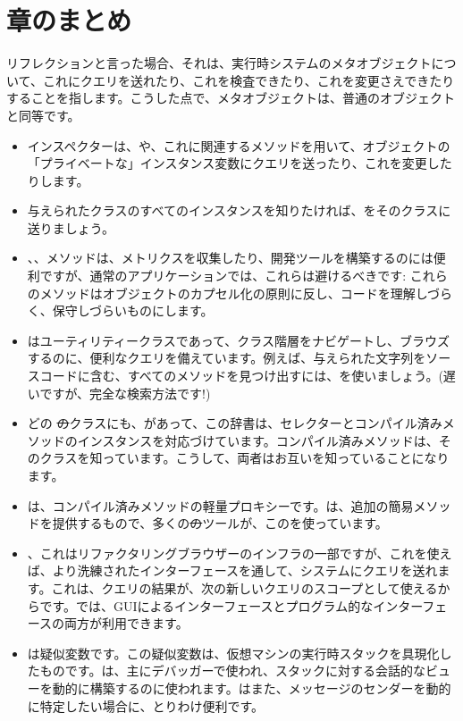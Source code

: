 \documentclass[a4paper,10pt,twoside]{book}
\begin{document}
\section{章のまとめ}

リフレクションと言った場合、それは、実行時システムのメタオブジェクトについて、これにクエリを送れたり、これを検査できたり、これを変更さえできたりすることを指します。こうした点で、メタオブジェクトは、普通のオブジェクトと同等です。

\begin{itemize}
\item インスペクターは、や、これに関連するメソッドを用いて、オブジェクトの「プライベートな」インスタンス変数にクエリを送ったり、これを変更したりします。
\item 与えられたクラスのすべてのインスタンスを知りたければ、をそのクラスに送りましょう。
\item {}、、\etc メソッドは、メトリクスを収集したり、開発ツールを構築するのには便利ですが、通常のアプリケーションでは、これらは避けるべきです: これらのメソッドはオブジェクトのカプセル化の原則に反し、コードを理解しづらく、保守しづらいものにします。
\item {}はユーティリティークラスであって、クラス階層をナビゲートし、ブラウズするのに、便利なクエリを備えています。例えば、与えられた文字列をソースコードに含む、すべてのメソッドを見つけ出すには、を使いましょう。(遅いですが、完全な検索方法です!)
\item どの \st のクラスにも、があって、この辞書は、セレクターとコンパイル済みメソッドのインスタンスを対応づけています。コンパイル済みメソッドは、そのクラスを知っています。こうして、両者はお互いを知っていることになります。
\item {}は、コンパイル済みメソッドの軽量プロキシーです。は、追加の簡易メソッドを提供するもので、多くの\st のツールが、このを使っています。
\item {}、これはリファクタリングブラウザーのインフラの一部ですが、これを使えば、より洗練されたインターフェースを通して、システムにクエリを送れます。これは、クエリの結果が、次の新しいクエリのスコープとして使えるからです。では、GUIによるインターフェースとプログラム的なインターフェースの両方が利用できます。
\item {}は疑似変数です。この疑似変数は、仮想マシンの実行時スタックを具現化したものです。は、主にデバッガーで使われ、スタックに対する会話的なビューを動的に構築するのに使われます。はまた、メッセージのセンダーを動的に特定したい場合に、とりわけ便利です。

\end{itemize}
\end{document}
